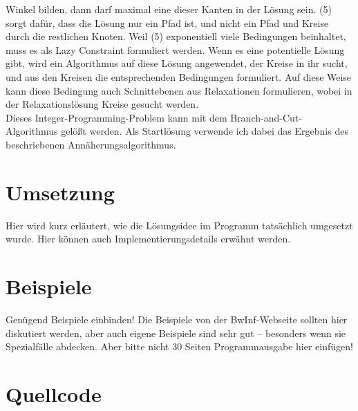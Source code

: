 \documentclass[a4paper,10pt,ngerman]{scrartcl}
\begin{document}
Winkel bilden, dann darf maximal eine dieser Kanten in der Lösung sein. (5) sorgt dafür, dass die Lösung nur ein Pfad ist, und nicht ein Pfad und
Kreise durch die restlichen Knoten. Weil (5) exponentiell viele Bedingungen beinhaltet, muss es als Lazy Constraint formuliert werden. Wenn es
eine potentielle Lösung gibt, wird ein Algorithmus auf diese Lösung angewendet, der Kreise in ihr sucht, und aus den Kreisen die entsprechenden Bedingungen
formuliert. Auf diese Weise kann diese Bedingung auch Schnittebenen aus Relaxationen formulieren, wobei in der Relaxationslösung Kreise gesucht werden. \\
Dieses Integer-Programming-Problem kann mit dem Branch-and-Cut-Algorithmus gelößt werden. Als Startlösung verwende ich dabei das Ergebnis des beschriebenen
Annäherungsalgorithmus.
\section{Umsetzung}
Hier wird kurz erläutert, wie die Lösungsidee im Programm tatsächlich umgesetzt
wurde. Hier können auch Implementierungsdetails erwähnt werden.

\section{Beispiele}
Genügend Beispiele einbinden! Die Beispiele von der BwInf-Webseite sollten hier
diskutiert werden, aber auch eigene Beispiele sind sehr gut – besonders wenn
sie Spezialfälle abdecken. Aber bitte nicht 30 Seiten Programmausgabe hier
einfügen!

\section{Quellcode}
\end{document}
